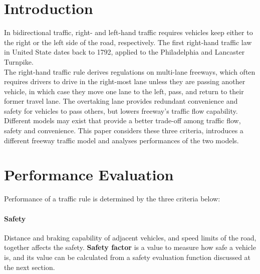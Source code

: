 

\section{Introduction}

In bidirectional traffic, right- and left-hand traffic requires 
vehicles keep either to the right or the left side of the road, 
respectively.\cite{Draper_Geoff_1993} The first right-hand 
traffic law in United State dates back to 1792, applied to the 
Philadelphia and Lancaster Turnpike.
\cite{Weingroff_Richard_2014}\\

The right-hand traffic rule derives regulations on multi-lane 
freeways, which often requires drivers to drive in the 
right-most lane unless they are passing another vehicle, in 
which case they move one lane to the left, pass, and return 
to their former travel lane. The overtaking lane provides 
redundant convenience and safety for vehicles to pass others, 
but lowers freeway's traffic flow capability.\\

Different models may exist that provide a better trade-off 
among traffic flow, safety and convenience. This paper 
considers these three criteria, introduces a different 
freeway traffic model and analyses performances of the two 
models.




\section{Performance Evaluation}

Performance of a traffic rule is determined by the three 
criteria below: 

\paragraph{Safety} Distance and braking capability of adjacent 
vehicles, and speed limits of the road, together affects the 
safety. \textbf{Safety factor \alpha} is a value to measure 
how safe a vehicle is, and its value can be calculated from 
a safety evaluation function discussed at the next section.

